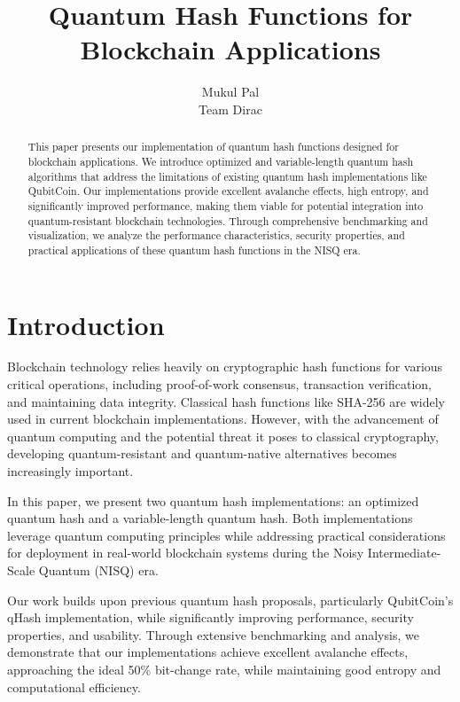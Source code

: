 \documentclass[conference]{IEEEtran}
\begin{document}
\onecolumn
\title{Quantum Hash Functions for Blockchain Applications}
\author{Mukul Pal\\
Team Dirac}
\maketitle

\begin{abstract}
This paper presents our implementation of quantum hash functions designed for blockchain applications. We introduce optimized and variable-length quantum hash algorithms that address the limitations of existing quantum hash implementations like QubitCoin. Our implementations provide excellent avalanche effects, high entropy, and significantly improved performance, making them viable for potential integration into quantum-resistant blockchain technologies. Through comprehensive benchmarking and visualization, we analyze the performance characteristics, security properties, and practical applications of these quantum hash functions in the NISQ era.
\end{abstract}

\section{Introduction}
Blockchain technology relies heavily on cryptographic hash functions for various critical operations, including proof-of-work consensus, transaction verification, and maintaining data integrity. Classical hash functions like SHA-256 are widely used in current blockchain implementations. However, with the advancement of quantum computing and the potential threat it poses to classical cryptography, developing quantum-resistant and quantum-native alternatives becomes increasingly important.

In this paper, we present two quantum hash implementations: an optimized quantum hash and a variable-length quantum hash. Both implementations leverage quantum computing principles while addressing practical considerations for deployment in real-world blockchain systems during the Noisy Intermediate-Scale Quantum (NISQ) era.

Our work builds upon previous quantum hash proposals, particularly QubitCoin's qHash implementation, while significantly improving performance, security properties, and usability. Through extensive benchmarking and analysis, we demonstrate that our implementations achieve excellent avalanche effects, approaching the ideal 50\% bit-change rate, while maintaining good entropy and computational efficiency.
\end{document}
